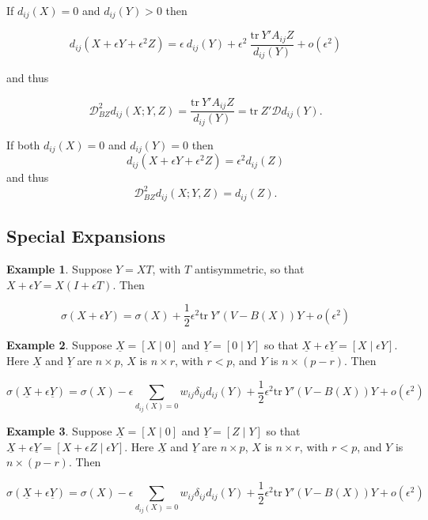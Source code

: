 \documentclass[
  12pt,
]{book}
\theoremstyle{definition}
\theoremstyle{definition}
\newtheorem{example}{Example}[chapter]
\theoremstyle{definition}
\theoremstyle{definition}
\theoremstyle{remark}
\begin{document}
If \(d_{ij}(X)=0\) and \(d_{ij}(Y)>0\) then

\[
d_{ij}(X+\epsilon Y+\epsilon^2 Z)=
\epsilon\ d_{ij}(Y)+\epsilon^2\ \frac{\text{tr}\ Y'A_{ij}Z}{d_{ij}(Y)}+o(\epsilon^2)
\]

and thus

\[
\mathcal{D}^2_{BZ}d_{ij}(X;Y,Z)=\frac{\text{tr}\ Y'A_{ij}Z}{d_{ij}(Y)}=\text{tr}\ Z'\mathcal{D}d_{ij}(Y).
\]

If both \(d_{ij}(X)=0\) and \(d_{ij}(Y)=0\) then
\[
d_{ij}(X+\epsilon Y+\epsilon^2 Z)=\epsilon^2d_{ij}(Z)
\]
and thus
\[
\mathcal{D}^2_{BZ}d_{ij}(X;Y,Z)=d_{ij}(Z).
\]

\hypertarget{propspecexp}{%
\subsection{Special Expansions}\label{propspecexp}}

\begin{example}
\protect\hypertarget{exm:exantisym}{}{\label{exm:exantisym} }Suppose \(Y=XT\), with \(T\) antisymmetric, so that \(X+\epsilon Y=X(I+\epsilon T)\). Then

\begin{equation}
\sigma(X+\epsilon
Y)=\sigma(X)+\frac12\epsilon^2\text{tr}\ Y'(V-B(X))Y+o(\epsilon^2)
\label{eq:antisym}
\end{equation}
\end{example}

\begin{example}
\protect\hypertarget{exm:exzeroes}{}{\label{exm:exzeroes} }Suppose \(\underline{X}=[X\mid 0]\) and \(\underline{Y}=[0\mid Y]\) so that \(\underline{X}+\epsilon\underline{Y}=[X\mid\epsilon Y]\). Here \(\underline{X}\) and \(\underline{Y}\) are \(n\times p\), \(X\) is \(n\times r\), with \(r<p\), and \(Y\) is \(n\times(p-r)\). Then

\begin{equation}
\sigma(\underline{X}+\epsilon
\underline{Y})=\sigma(X)-\epsilon\sum_{d_{ij}(X)=0}w_{ij}\delta_{ij}d_{ij}(Y)
+\frac12\epsilon^2\text{tr}\ Y'(V-B(X))Y+o(\epsilon^2)
\label{eq:exzeroes}
\end{equation}
\end{example}

\begin{example}
\protect\hypertarget{exm:exsingular}{}{\label{exm:exsingular} }Suppose \(\underline{X}=[X\mid 0]\) and \(\underline{Y}=[Z\mid Y]\) so that \(\underline{X}+\epsilon\underline{Y}=[X+\epsilon Z\mid\epsilon Y]\). Here \(\underline{X}\) and \(\underline{Y}\) are \(n\times p\), \(X\) is \(n\times r\), with \(r<p\), and \(Y\) is \(n\times(p-r)\). Then

\begin{equation}
\sigma(\underline{X}+\epsilon
\underline{Y})=\sigma(X)-\epsilon\sum_{d_{ij}(X)=0}w_{ij}\delta_{ij}d_{ij}(Y)
+\frac12\epsilon^2\text{tr}\ Y'(V-B(X))Y+o(\epsilon^2)
\label{eq:exsingular}
\end{equation}
\end{example}
\end{document}
